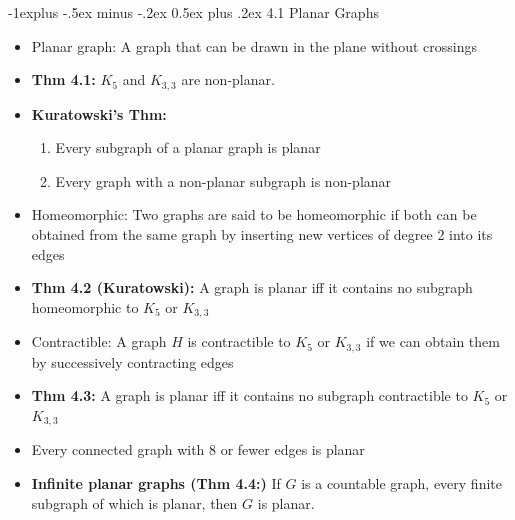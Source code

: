 \documentclass[10pt,landscape]{article}
\makeatletter
\renewcommand{\subsection}{\@startsection{subsection}{2}{0mm}%
                                {-1explus -.5ex minus -.2ex}%
                                {0.5ex plus .2ex}%
                                {\normalfont\normalsize\bfseries}}
\makeatother
\begin{document}
\begin{multicols}{2}
\subsection{4.1 Planar Graphs}
\begin{itemize}
    \item Planar graph: A graph that can be drawn in the plane without crossings
    \item \textbf{Thm 4.1:} $K_5$ and $K_{3,3}$ are non-planar.
    \item \textbf{Kuratowski's Thm:}
    \begin{enumerate}
        \item Every subgraph of a planar graph is planar
        \item Every graph with a non-planar subgraph is non-planar
    \end{enumerate}
        \item Homeomorphic: Two graphs are said to be homeomorphic if both can be obtained from the same graph by inserting new vertices of degree 2 into its edges
        \item \textbf{Thm 4.2 (Kuratowski):} A graph is planar iff it contains no subgraph homeomorphic to $K_5$ or $K_{3,3}$
        \item Contractible: A graph $H$ is contractible to $K_5$ or $K_{3,3}$ if we can obtain them by successively contracting edges
        \item \textbf{Thm 4.3:} A graph is planar iff it contains no subgraph contractible to $K_5$ or $K_{3,3}$
        \item Every connected graph with 8 or fewer edges is planar
        \item \textbf{Infinite planar graphs (Thm 4.4:)} If $G$ is a countable graph, every finite subgraph of which is planar, then $G$ is planar.


\end{itemize}
\end{multicols}
\end{document}
